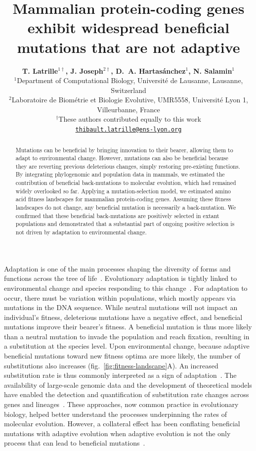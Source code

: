 \documentclass{article}
\title{Mammalian protein-coding genes exhibit widespread beneficial mutations that are not adaptive}
\author{
    \large
    \textbf{T. {Latrille}$^{1\dag}$\orcidlink{0000-0002-9643-4668}, J. {Joseph}$^{2\dag}$\orcidlink{0009-0002-1312-9930}, D.~A. {Hartasánchez}$^{1}$\orcidlink{0000-0003-2596-6883}, N. {Salamin}$^{1}$\orcidlink{0000-0002-3963-4954}}\\
    \normalsize
    $^{1}$Department of Computational Biology, Université de Lausanne, Lausanne, Switzerland\\
    $^{2}$Laboratoire de Biométrie et Biologie Evolutive, UMR5558, Université Lyon 1, Villeurbanne, France \\
    $^{\dag}$These authors contributed equally to this work\\
    \texttt{\href{mailto:thibault.latrille@ens-lyon.org}{thibault.latrille@ens-lyon.org}} \\
}
\begin{document}
    \maketitle

    \begin{abstract}
        Mutations can be beneficial by bringing innovation to their bearer, allowing them to adapt to environmental change.
        However, mutations can also be beneficial because they are reverting previous deleterious changes, simply restoring pre-existing functions.
        By integrating phylogenomic and population data in mammals, we estimated the contribution of beneficial back-mutations to molecular evolution, which had remained widely overlooked so far.
        Applying a mutation-selection model, we estimated amino acid fitness landscapes for mammalian protein-coding genes.
        Assuming these fitness landscapes do not change, any beneficial mutation is necessarily a back-mutation.
        We confirmed that these beneficial back-mutations are positively selected in extant populations and demonstrated that a substantial part of ongoing positive selection is not driven by adaptation to environmental change.
    \end{abstract}


    Adaptation is one of the main processes shaping the diversity of forms and functions across the tree of life~\cite{darwin_origin_1859}.
    Evolutionary adaptation is tightly linked to environmental change and species responding to this change~\cite{merrell_adaptive_1994, gavrilets_adaptive_2009}.
    For adaptation to occur, there must be variation within populations, which mostly appears via mutations in the DNA sequence.
    While neutral mutations will not impact an individual's fitness, deleterious mutations have a negative effect, and beneficial mutations improve their bearer's fitness.
    A beneficial mutation is thus more likely than a neutral mutation to invade the population and reach fixation, resulting in a substitution at the species level.
    Upon environmental change, because adaptive beneficial mutations toward new fitness optima are more likely, the number of substitutions also increases (fig.~\ref{fig:fitness-landscape}A).
    An increased substitution rate is thus commonly interpreted as a sign of adaptation~\cite{mcdonald_adaptative_1991, smith_adaptive_2002, welch_estimating_2006}.
    The availability of large-scale genomic data and the development of theoretical models have enabled the detection and quantification of substitution rate changes across genes and lineages~\cite{yang_statistical_2000, eyre-walker_genomic_2006, moutinho_variation_2019}.
    These approaches, now common practice in evolutionary biology, helped better understand the processes underpinning the rates of molecular evolution.
    However, a collateral effect has been conflating beneficial mutations with adaptive evolution when adaptive evolution is not the only process that can lead to beneficial mutations~\cite{charlesworth_other_2007, mustonen_fitness_2009}.
\end{document}
